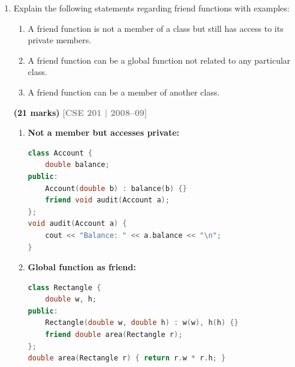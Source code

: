 \documentclass[12pt,a3paper]{article}
\newcommand{\yr}[1]{\hfill\textcolor{gray}{\small\textbf{[#1]}}}
\newcommand{\mk}[1]{\textcolor{orange!70!black}{\small\textbf{(#1 marks)}}}
\begin{document}
\begin{enumerate}
\begin{tcolorbox}[enhanced,breakable,ansbox,colback=cD!4,colframe=cD,
  boxrule=0.8pt,arc=5pt,
  title={\textbf{Answer --- Friend vs member function; advantages}},
  fonttitle=\bfseries\color{white},colbacktitle=cD]
\textbf{Advantages of friend functions:}
\begin{enumerate}[label=\textbf{\arabic*.}]
  \item Can access private data of two or more classes.
  \item Enables symmetric operator overloading.
  \item Keeps class interface minimal while granting necessary access.
  \item Flexible: can be a global function, a member of another
    class, or a whole friend class.
\end{enumerate}

\end{tcolorbox}

\item Explain the following statements regarding friend functions with examples:
\begin{enumerate}
  \item A friend function is not a member of a class but still has access to its private members.
  \item A friend function can be a global function not related to any particular class.
  \item A friend function can be a member of another class.
\end{enumerate}
\mk{21}
\yr{CSE 201 | 2008--09}


\begin{tcolorbox}[enhanced,breakable,ansbox,colback=cD!4,colframe=cD,
  boxrule=0.8pt,arc=5pt,
  title={\textbf{Answer --- Three statements about friend functions}},
  fonttitle=\bfseries\color{white},colbacktitle=cD]

\begin{enumerate}[label=\textbf{(\alph*)}]

\item \textbf{Not a member but accesses private:}
\begin{lstlisting}[language=C++]
class Account {
    double balance;
public:
    Account(double b) : balance(b) {}
    friend void audit(Account a);
};
void audit(Account a) {
    cout << "Balance: " << a.balance << "\n";
}
\end{lstlisting}

\item \textbf{Global function as friend:}
\begin{lstlisting}[language=C++]
class Rectangle {
    double w, h;
public:
    Rectangle(double w, double h) : w(w), h(h) {}
    friend double area(Rectangle r);
};
double area(Rectangle r) { return r.w * r.h; }
\end{lstlisting}


\end{enumerate}
\end{tcolorbox}
\end{enumerate}
\end{document}
